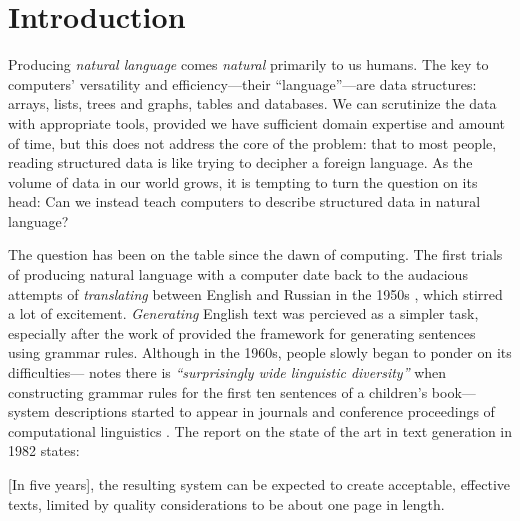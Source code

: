 \chapter{Introduction}
\label{chap:intro}
Producing \emph{natural language} comes \emph{natural} primarily to us humans.
The key to computers' versatility and efficiency---their ``language''---are data structures: arrays, lists, trees and graphs, tables and databases.
We can scrutinize the data with appropriate tools, provided we have sufficient domain expertise and amount of time, but this does not address the core of the problem: that to most people, reading structured data is like trying to decipher a foreign language. As the volume of data in our world grows, it is tempting to turn the question on its head: Can we instead teach computers to describe structured data in natural language?


The question has been on the table since the dawn of computing. The first trials of producing natural language with a computer date back to the audacious attempts of \emph{translating} between English and Russian in the 1950s \cite{sheridan1955research}, which stirred a lot of excitement. \emph{Generating} English text was percieved as a simpler task, especially after the work of \citet{chomsky1957syntactic} provided the framework for generating sentences using grammar rules. Although in the 1960s, people slowly began to ponder on its difficulties---\citet{yngve1961random} notes there is \emph{``surprisingly wide linguistic diversity''} when constructing grammar rules for the first ten sentences of a children's book---system descriptions started to appear in journals and conference proceedings of computational linguistics \cite{woolley-1969-automatic,meehan-1975-using,mcdonald-1975-framework,wang-1980-computational}. The report on the state of the art in text generation in 1982 states:

\begin{pquotation}{\citealp{mann-1982-text}}
  [In five years], the resulting system can be expected to create acceptable, effective texts, limited by quality considerations to be about one page in length.
\end{pquotation}

